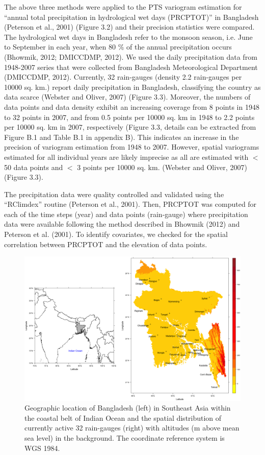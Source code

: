 The above three methods were applied to the PTS variogram estimation for “annual total precipitation in hydrological wet days (PRCPTOT)” in Bangladesh (Peterson et al., 2001) (Figure 3.2) and their precision statistics were compared. The hydrological wet days in Bangladesh refer to the monsoon season, i.e. June to September in each year, when 80 \% of the annual precipitation occurs (Bhowmik, 2012; DMICCDMP, 2012). We used the daily precipitation data from 1948-2007 series that were collected from Bangladesh Meteorological Department (DMICCDMP, 2012). Currently, 32 rain-gauges (density 2.2 rain-gauges per 10000 sq. km.) report daily precipitation in Bangladesh, classifying the country as data scarce (Webster and Oliver, 2007) (Figure 3.3). Moreover, the numbers of data points and data density exhibit an increasing coverage from 8 points in 1948 to 32 points in 2007, and from 0.5 points per 10000 sq. km in 1948 to 2.2 points per 10000 sq. km in 2007, respectively (Figure 3.3, details can be extracted from Figure B.1 and Table B.1 in appendix B). This indicates an increase in the precision of variogram estimation from 1948 to 2007. However, spatial variograms estimated for all individual years are likely imprecise as all are estimated with $<$ 50 data points and $<$ 3 points per 10000 sq. km. (Webster and Oliver, 2007) (Figure 3.3).

The precipitation data were quality controlled and validated using the “RClimdex” routine (Peterson et al., 2001). Then, PRCPTOT was computed for each of the time steps (year) and data points (rain-gauge) where precipitation data were available following the method described in Bhowmik (2012) and Peterson et al. (2001). To identify covariates, we checked for the spatial correlation between PRCPTOT and the elevation of data points.

\begin{figure}[t]
  \centering
  \includegraphics[width=\textwidth]{Figures/Fig_3_2.png}
  \caption{Geographic location of Bangladesh (left) in Southeast Asia within the coastal belt of Indian Ocean and the spatial distribution of currently active 32 rain-gauges (right) with altitudes (m above mean sea level) in the background. The coordinate reference system is WGS 1984.}
  \label{Fig_3_2}
\end{figure}

